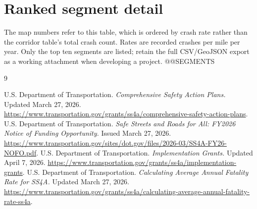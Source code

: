 \documentclass[10pt,letterpaper]{article}
\begin{document}
\clearpage
\appendix
\section{Ranked segment detail}\label{segments}
The map numbers refer to this table, which is ordered by crash rate rather than the
corridor table's total crash count. Rates are recorded crashes per mile per year.
Only the top ten segments are listed; retain the full CSV/GeoJSON export as a
working attachment when developing a project.
@@SEGMENTS

\begin{thebibliography}{9}
\raggedright
{} U.S. Department of Transportation. \emph{Comprehensive Safety Action Plans.}
Updated March 27, 2026. \url{https://www.transportation.gov/grants/ss4a/comprehensive-safety-action-plans}.
 U.S. Department of Transportation. \emph{Safe Streets and Roads for All: FY2026 Notice of Funding Opportunity.}
Issued March 27, 2026. \url{https://www.transportation.gov/sites/dot.gov/files/2026-03/SS4A-FY26-NOFO.pdf}.
 U.S. Department of Transportation. \emph{Implementation Grants.}
Updated April 7, 2026. \url{https://www.transportation.gov/grants/ss4a/implementation-grants}.
 U.S. Department of Transportation. \emph{Calculating Average Annual Fatality Rate for SS4A.}
Updated March 27, 2026. \url{https://www.transportation.gov/grants/ss4a/calculating-average-annual-fatality-rate-ss4a}.
\end{thebibliography}
\end{document}
